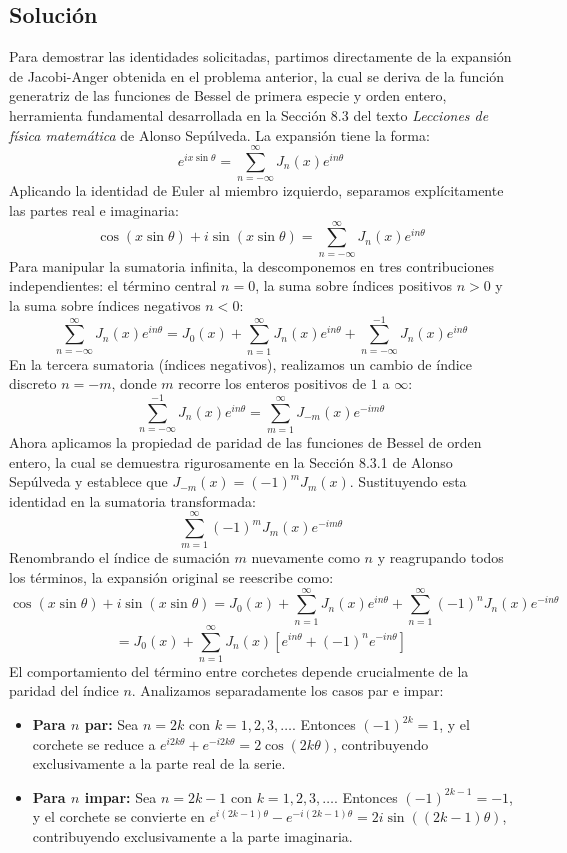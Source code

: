 \documentclass[a4paper]{article}
\begin{document}
\subsection{Solución}
Para demostrar las identidades solicitadas, partimos directamente de la expansión de Jacobi-Anger obtenida en el problema anterior, la cual se deriva de la función generatriz de las funciones de Bessel de primera especie y orden entero, herramienta fundamental desarrollada en la Sección 8.3 del texto \textit{Lecciones de física matemática} de Alonso Sepúlveda. La expansión tiene la forma:
$$e^{ix\sin\theta}= \sum_{n=-\infty}^{\infty} J_n(x) e^{in\theta}$$
Aplicando la identidad de Euler al miembro izquierdo, separamos explícitamente las partes real e imaginaria:
$$\cos(x\sin\theta) + i\sin(x\sin\theta) = \sum_{n=-\infty}^{\infty} J_n(x) e^{in\theta}$$
Para manipular la sumatoria infinita, la descomponemos en tres contribuciones independientes: el término central $n=0$, la suma sobre índices positivos $n>0$ y la suma sobre índices negativos $n<0$:
$$\sum_{n=-\infty}^{\infty} J_n(x) e^{in\theta} = J_0(x) + \sum_{n=1}^{\infty} J_n(x) e^{in\theta} + \sum_{n=-\infty}^{-1} J_n(x) e^{in\theta}$$
En la tercera sumatoria (índices negativos), realizamos un cambio de índice discreto $n = -m$, donde $m$ recorre los enteros positivos de $1$ a $\infty$:
$$\sum_{n=-\infty}^{-1} J_n(x) e^{in\theta} = \sum_{m=1}^{\infty} J_{-m}(x) e^{-im\theta}$$
Ahora aplicamos la propiedad de paridad de las funciones de Bessel de orden entero, la cual se demuestra rigurosamente en la Sección 8.3.1 de Alonso Sepúlveda y establece que $J_{-m}(x) = (-1)^m J_m(x)$. Sustituyendo esta identidad en la sumatoria transformada:
$$\sum_{m=1}^{\infty} (-1)^m J_m(x) e^{-im\theta}$$
Renombrando el índice de sumación $m$ nuevamente como $n$ y reagrupando todos los términos, la expansión original se reescribe como:
$$\cos(x\sin\theta) + i\sin(x\sin\theta) = J_0(x) + \sum_{n=1}^{\infty} J_n(x) e^{in\theta} + \sum_{n=1}^{\infty} (-1)^n J_n(x) e^{-in\theta}$$
$$= J_0(x) + \sum_{n=1}^{\infty} J_n(x) \left[ e^{in\theta} + (-1)^n e^{-in\theta} \right]$$
El comportamiento del término entre corchetes depende crucialmente de la paridad del índice $n$. Analizamos separadamente los casos par e impar:
\begin{itemize}
\item \textbf{Para $n$ par:} Sea $n=2k$ con $k=1,2,3,\dots$. Entonces $(-1)^{2k}=1$, y el corchete se reduce a $e^{i2k\theta} + e^{-i2k\theta} = 2\cos(2k\theta)$, contribuyendo exclusivamente a la parte real de la serie.
\item \textbf{Para $n$ impar:} Sea $n=2k-1$ con $k=1,2,3,\dots$. Entonces $(-1)^{2k-1}=-1$, y el corchete se convierte en $e^{i(2k-1)\theta} - e^{-i(2k-1)\theta} = 2i\sin((2k-1)\theta)$, contribuyendo exclusivamente a la parte imaginaria.
\end{itemize}
\end{document}
